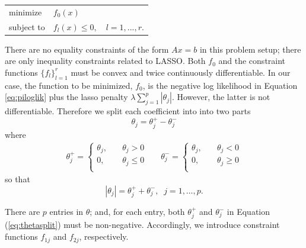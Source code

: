 \documentclass[11pt]{article}
\begin{document}
\begin{center}\begin{tabular}{ll}
minimize &$f_0(x)$\\
subject to &$f_l(x) \leq 0, \quad l = 1, ..., r$.
\end{tabular}\end{center}

There are no equality constraints of the form $Ax = b$ in this problem setup; there are only inequality constraints related to LASSO. Both $f_0$ and the constraint functions $\{ f_l \}_{l = 1}^r$ must be convex and twice continuously differentiable. In our case, the function to be minimized, $f_0$, is the negative log likelihood in Equation \ref{eq:piloglik} plus the lasso penalty $\lambda \sum_{j = 1}^p |\theta_j|$. However, the latter is not differentiable. 
Therefore we split each coefficient into into two parts 
\begin{equation}\theta_j = \theta_j^+ - \theta_j^-\label{eq:thetasplit}\end{equation} where 
\begin{align}
\theta_j^+ = \left\{\begin{array}{ll}\theta_j, \quad& \theta_j > 0\\0, \quad& \theta_j \leq 0\\\end{array}\right.&&
\theta_j^- = \left\{\begin{array}{ll}\theta_j, \quad& \theta_j < 0\\0, \quad& \theta_j \geq 0\\\end{array}\right.
\label{eg:thetadefs}\end{align}
so that
$$|\theta_j| = \theta_j^+ + \theta_j^-, \;\; j=1,\ldots,p.$$

There are $p$ entries in $\theta$; and, for each entry, both $\theta_j^+$ and $\theta_j^-$ in Equation (\ref{eq:thetasplit}) must be non-negative. Accordingly, we introduce constraint functions $f_{1j}$ and $f_{2j}$, respectively. 
\end{document}
